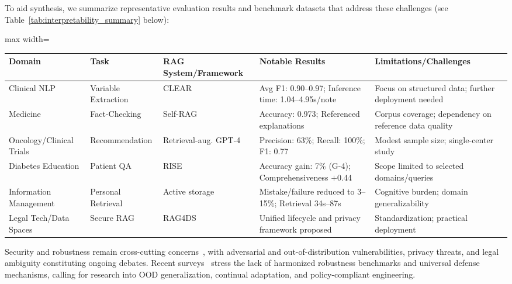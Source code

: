 \documentclass[sigconf]{acmart}
\begin{document}
To aid synthesis, we summarize representative evaluation results and benchmark datasets that address these challenges (see Table~\ref{tab:interpretability_summary} below):

\begin{table*}[htbp]
\centering
\caption{Sample evaluation results highlighting interpretability, reliability, and human-in-the-loop challenges in RAG systems across domains}
\label{tab:interpretability_summary}
\begin{adjustbox}{max width=\textwidth}
\begin{tabular}{@{}lllll@{}}
\toprule
Domain & Task & RAG System/Framework & Notable Results & Limitations/Challenges \\
\midrule
Clinical NLP & Variable Extraction & CLEAR~\cite{ref3} & Avg F1: 0.90--0.97; Inference time: 1.04--4.95s/note & Focus on structured data; further deployment needed \\
Medicine & Fact-Checking & Self-RAG~\cite{ref54} & Accuracy: 0.973; Referenced explanations & Corpus coverage; dependency on reference data quality \\
Oncology/Clinical Trials & Recommendation & Retrieval-aug. GPT-4~\cite{ref53} & Precision: 63\%; Recall: 100\%; F1: 0.77 & Modest sample size; single-center study \\
Diabetes Education & Patient QA & RISE~\cite{ref55} & Accuracy gain: 7\% (G-4); Comprehensiveness $+$0.44 & Scope limited to selected domains/queries \\
Information Management & Personal Retrieval & Active storage~\cite{ref39,ref40} & Mistake/failure reduced to 3--15\%; Retrieval 34s--87s & Cognitive burden; domain generalizability \\
Legal Tech/Data Spaces & Secure RAG & RAG4DS~\cite{ref64} & Unified lifecycle and privacy framework proposed & Standardization; practical deployment \\
\bottomrule
\end{tabular}
\end{adjustbox}
\end{table*}

Security and robustness remain cross-cutting concerns~\cite{ref26,ref63,ref64}, with adversarial and out-of-distribution vulnerabilities, privacy threats, and legal ambiguity constituting ongoing debates. Recent surveys~\cite{ref26,ref63,ref64} stress the lack of harmonized robustness benchmarks and universal defense mechanisms, calling for research into OOD generalization, continual adaptation, and policy-compliant engineering.
\end{document}
